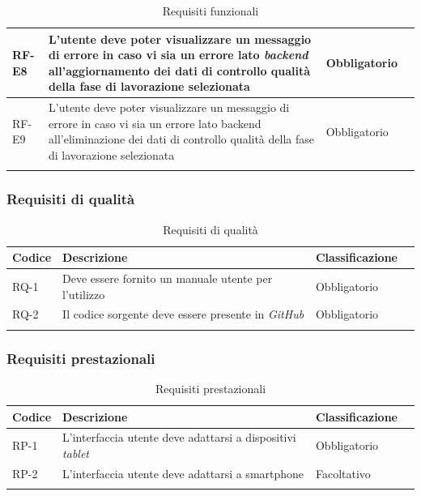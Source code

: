 \begin{longtable}{>{\centering\arraybackslash}m{}>{\centering\arraybackslash}m{}>{\centering\arraybackslash}m{}>{\centering\arraybackslash}m{}}
    \hline
    RF-E8 & L’utente deve poter visualizzare un messaggio di errore in caso vi sia un errore lato \textit{backend} all’aggiornamento dei dati di controllo qualità della fase di lavorazione selezionata & Obbligatorio \\
    \hline
    RF-E9 & L’utente deve poter visualizzare un messaggio di errore in caso vi sia un errore lato backend all’eliminazione dei dati di controllo qualità della fase di lavorazione selezionata & Obbligatorio \\
    \hline
    \caption{Requisiti funzionali}
    \label{tab:requisiti-funzionali}
\end{longtable}

\subsubsection*{Requisiti di qualità}
\begin{longtable}{>{\centering\arraybackslash}m{}>{\centering\arraybackslash}m{}>{\centering\arraybackslash}m{}>{\centering\arraybackslash}m{}}
    \hline
    \rowcolor{black}
    \color{white}\textbf{Codice} & \color{white}\textbf{Descrizione} & \color{white}\textbf{Classificazione} \\
    \hline
    \endhead %
    RQ-1 & Deve essere fornito un manuale utente per l’utilizzo & Obbligatorio \\
    \hline
    RQ-2 & Il codice sorgente deve essere presente in \textit{GitHub} & Obbligatorio \\
    \hline
    \caption{Requisiti di qualità}
\end{longtable}

\subsubsection*{Requisiti prestazionali}
\begin{longtable}{>{\centering\arraybackslash}m{}>{\centering\arraybackslash}m{}>{\centering\arraybackslash}m{}>{\centering\arraybackslash}m{}}
    \hline
    \rowcolor{black}
    \color{white}\textbf{Codice} & \color{white}\textbf{Descrizione} & \color{white}\textbf{Classificazione} \\
    \hline
    \endhead %
    RP-1 & L’interfaccia utente deve adattarsi a dispositivi \textit{tablet} & Obbligatorio \\
    \hline
    RP-2 & L’interfaccia utente deve adattarsi a smartphone & Facoltativo \\
    \hline
    \caption{Requisiti prestazionali}
\end{longtable}

